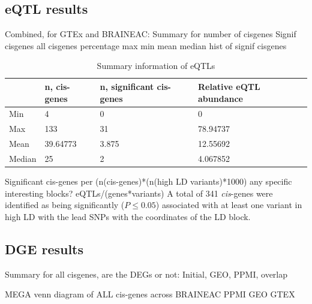 \documentclass{article}
\begin{document}
\newpage
\subsection{eQTL results}
Combined, for GTEx and BRAINEAC:
Summary for number of cisgenes
Signif cisgenes all cisgenes percentage
max
min
mean
median
hist of signif cisgenes

\begin{table}[h]
\begin{tabular}{|l|l|l|l|}
\hline
       & n, cis-genes & n, significant cis-genes & Relative eQTL abundance \\ \hline
Min    & 4                   & 0                               & 0                                       \\ \hline
Max    & 133                 & 31                              & 78.94737                                \\ \hline
Mean   & 39.64773            & 3.875                           & 12.55692                                \\ \hline
Median & 25                  & 2                               & 4.067852                                \\ \hline
\end{tabular}
\caption{Summary information of eQTLs}
\end{table}





Significant cis-genes per (n(cis-genes)*(n(high LD variants)*1000)
any specific interesting blocks?
eQTLs/(genes*variants)
A total of 341 \textit{cis}-genes were identified as being significantly ($P \leq 0.05$) associated with at least one variant in high LD with the lead SNPs with the coordinates of the LD block.


\subsection{DGE results}

Summary for all cisgenes, are the DEGs or not:
Initial, GEO, PPMI, overlap

MEGA venn diagram of ALL cis-genes across BRAINEAC PPMI GEO GTEX
\end{document}
